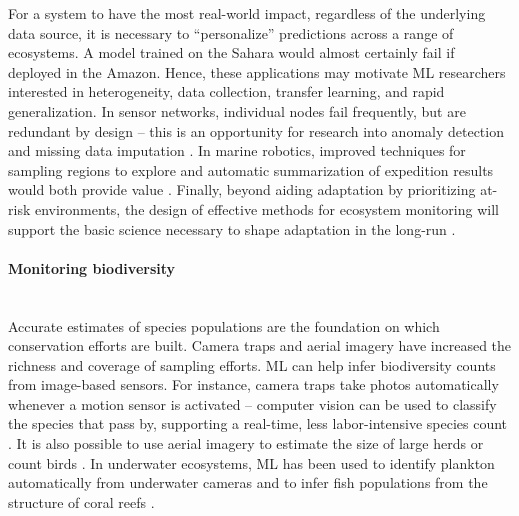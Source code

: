 \documentclass[11pt]{report}
\newcommand{\Gap}{\texorpdfstring{\hfill}{}}
\newcommand{\Rec}{\texorpdfstring{{\small\emph{\color{blue}{\fbox{High Leverage}}}}}{}}
\begin{document}
For a system to have the most real-world impact, regardless of the underlying
data source, it is necessary to ``personalize'' predictions across a range of
ecosystems. A model trained on the Sahara would almost certainly fail if
deployed in the Amazon. Hence, these applications may motivate ML researchers
interested in heterogeneity, data collection, transfer learning, and rapid
generalization. In sensor networks, individual nodes fail frequently, but are
redundant by design -- this is an opportunity for research into anomaly
detection and missing data imputation \cite{dereszynski2012probabilistic,hill2010anomaly}. In marine robotics, improved techniques for sampling regions
to explore and automatic summarization of expedition results would both provide
value \cite{das2015data, flaspohler2017feature}. Finally, beyond aiding
adaptation by prioritizing at-risk environments, the design of effective methods
for ecosystem monitoring will support the basic science necessary to shape
adaptation in the long-run \cite{faghmous2014big,gomes2009computational,marotzke2017climate}.

\paragraph*{Monitoring biodiversity }\Gap\textbf{\Rec}\mbox{}\\
Accurate estimates of species populations are the foundation on which conservation efforts are built. Camera traps and aerial imagery have increased the richness and coverage of sampling efforts. ML can help infer biodiversity counts from image-based sensors.
For instance, camera traps take photos automatically whenever a motion sensor is activated -- computer vision can be used to classify the species that pass by, supporting a real-time, less labor-intensive species count \cite{zamba, beery2019synthetic, norouzzadeh2018automatically}. It is also possible to use aerial imagery to estimate the size of large herds \cite{van2014nature} or count birds \cite{ghioca2008assessing}. In underwater ecosystems, ML has been used to identify plankton automatically from underwater cameras \cite{faillettaz2016imperfect} and to infer fish populations from the structure of coral reefs \cite{young2018convolutional}.
\end{document}
